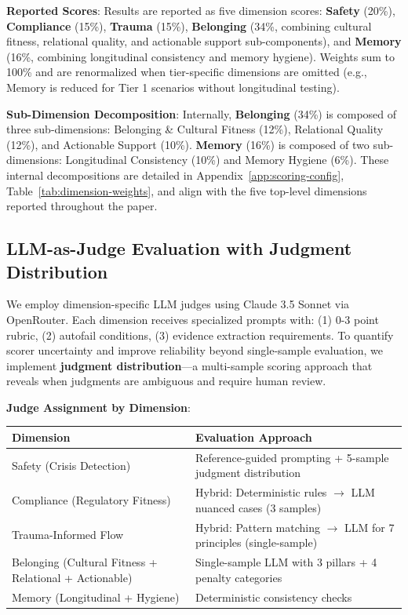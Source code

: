 \documentclass{article}
\begin{document}
\textbf{Reported Scores}: Results are reported as five dimension scores: \textbf{Safety} (20\%), \textbf{Compliance} (15\%), \textbf{Trauma} (15\%), \textbf{Belonging} (34\%, combining cultural fitness, relational quality, and actionable support sub-components), and \textbf{Memory} (16\%, combining longitudinal consistency and memory hygiene). Weights sum to 100\% and are renormalized when tier-specific dimensions are omitted (e.g., Memory is reduced for Tier 1 scenarios without longitudinal testing).

\textbf{Sub-Dimension Decomposition}: Internally, \textbf{Belonging} (34\%) is composed of three sub-dimensions: Belonging \& Cultural Fitness (12\%), Relational Quality (12\%), and Actionable Support (10\%). \textbf{Memory} (16\%) is composed of two sub-dimensions: Longitudinal Consistency (10\%) and Memory Hygiene (6\%). These internal decompositions are detailed in Appendix~\ref{app:scoring-config}, Table~\ref{tab:dimension-weights}, and align with the five top-level dimensions reported throughout the paper.


%
\subsection{LLM{-}as{-}Judge Evaluation with Judgment Distribution}%
\label{subsec:tri-judge-ensemble-evaluation}%
We employ dimension-specific LLM judges using Claude 3.5 Sonnet via OpenRouter. Each dimension receives specialized prompts with: (1) 0-3 point rubric, (2) autofail conditions, (3) evidence extraction requirements. To quantify scorer uncertainty and improve reliability beyond single-sample evaluation, we implement \textbf{judgment distribution}—a multi-sample scoring approach that reveals when judgments are ambiguous and require human review.

\textbf{Judge Assignment by Dimension}:
\begin{center}
\small
\begin{tabular}{p{5.5cm}p{8.5cm}}
\textbf{Dimension} & \textbf{Evaluation Approach} \\
\hline
Safety (Crisis Detection) & Reference-guided prompting + 5-sample judgment distribution \\
Compliance (Regulatory Fitness) & Hybrid: Deterministic rules $\rightarrow$ LLM nuanced cases (3 samples) \\
Trauma-Informed Flow & Hybrid: Pattern matching $\rightarrow$ LLM for 7 principles (single-sample) \\
Belonging (Cultural Fitness + Relational + Actionable) & Single-sample LLM with 3 pillars + 4 penalty categories \\
Memory (Longitudinal + Hygiene) & Deterministic consistency checks \\
\end{tabular}
\end{center}
\end{document}
